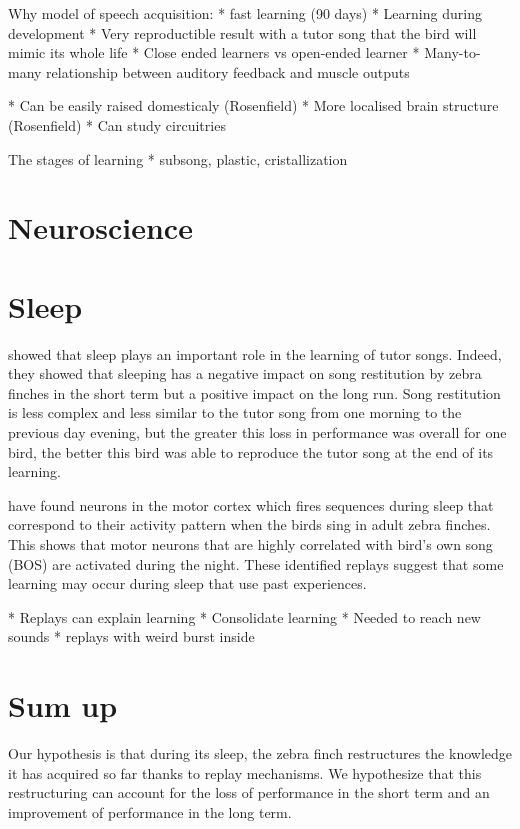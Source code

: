 \documentclass{report}
\begin{document}
Why model of speech acquisition:
* fast learning (90 days)
* Learning during development \cite{margoliash_offline_2003}
* Very reproductible result with a tutor song that the bird will mimic its whole
  life \cite{margoliash_sleep_2010}
    * Close ended learners vs open-ended learner \cite{margoliash_sleep_2010}
* Many-to-many relationship between auditory feedback and muscle outputs \cite{margoliash_offline_2003}

* Can be easily raised domesticaly (Rosenfield)
* More localised brain structure (Rosenfield)
    * Can study circuitries



The stages of learning
* subsong, plastic, cristallization \cite{margoliash_sleep_2010}


\section{Neuroscience}

\section{Sleep}
\textcite{deregnaucourt_how_2005} showed that sleep plays an important role in
the learning of tutor songs. Indeed, they showed that sleeping has a negative
impact on song restitution by zebra finches in the short term but a positive
impact on the long run. Song restitution is less complex and less similar to the
tutor song from one morning to the previous day evening, but the greater this
loss in performance was overall for one bird, the better this bird was able to
reproduce the tutor song at the end of its learning.

\textcite{dave_song_2000} have found neurons in the motor cortex which fires
sequences during sleep that correspond to their activity pattern when the birds
sing in adult zebra finches. This shows that motor neurons that are highly
correlated with bird's own song (BOS) are activated during the night. These
identified replays suggest that some learning may occur during sleep that use
past experiences.

* Replays can explain learning \cite{margoliash_offline_2003}
* Consolidate learning
* Needed to reach new sounds \cite{margoliash_offline_2003}
* replays with weird burst inside \cite{margoliash_evaluating_2002}

\section{Sum up}
Our hypothesis is that during its sleep, the zebra finch restructures the
knowledge it has acquired so far thanks to replay mechanisms. We hypothesize
that this restructuring can account for the loss of performance in the short
term and an improvement of performance in the long term.
\end{document}
